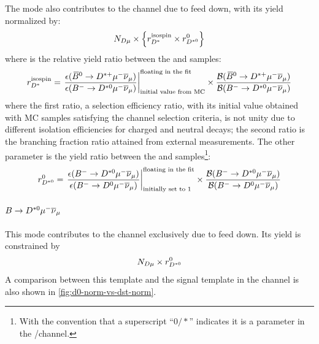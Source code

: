 The \Dstarp\muon mode also contributes to the \Dz channel due to feed down,
with its yield normalized by:
\begin{equation}
    N_{D\mu} \times \left\{
        r_{{{D}^*}}^\text{isospin} \times r_{{{D}^{*0}}}^{0}
    \right\}
\end{equation}
where \fitDstISO is the relative yield ratio between the \Dstarp\muon and
\Dstarz\muon samples:
\begin{equation}
    r_{{{D}^*}}^\text{isospin} =
    \left.\frac{
        \epsilon({{\kern 0.18em\overline{\kern -0.18em B}}{}^0} \rightarrow {\ensuremath{{D}^{*+}}}{\ensuremath{\mu^-}}{\ensuremath{{\overline{\nu}}_\mu}})
    }{
        \epsilon({{{B}^-}} \rightarrow {\ensuremath{{D}^{*0}}}{\ensuremath{\mu^-}}{\ensuremath{{\overline{\nu}}_\mu}})
    }\right|_\text{initial value from MC}^\text{floating in the fit}\times
    \frac{
        \mathcal{B}({{\kern 0.18em\overline{\kern -0.18em B}}{}^0} \rightarrow {\ensuremath{{D}^{*+}}}{\ensuremath{\mu^-}}{\ensuremath{{\overline{\nu}}_\mu}})
    }{
        \mathcal{B}({{{B}^-}} \rightarrow {\ensuremath{{D}^{*0}}}{\ensuremath{\mu^-}}{\ensuremath{{\overline{\nu}}_\mu}})
    }
\end{equation}
where the first ratio, a selection efficiency ratio,
with its initial value obtained with MC samples satisfying the \Dz channel
selection criteria,
is not unity due to different isolation efficiencies for charged
\Dstarp and neutral \Dstarz decays;
the second ratio is the branching fraction ratio attained from external
measurements.
The other parameter \fitnormfd is the yield ratio between the \Dstarz\muon and
\Dz\muon samples\footnote{
    With the convention that a superscript ``$0/*$'' indicates
    it is a parameter in the \Dz/\Dstar channel.
}:
\begin{equation}
    r_{{{D}^{*0}}}^{0} =
    \left.\frac{
        \epsilon({{{B}^-}} \rightarrow {\ensuremath{{D}^{*0}}}{\ensuremath{\mu^-}}{\ensuremath{{\overline{\nu}}_\mu}})
    }{
        \epsilon({{{B}^-}} \rightarrow {\ensuremath{{D}^0}}{\ensuremath{\mu^-}}{\ensuremath{{\overline{\nu}}_\mu}})
    }\right|_\text{initially set to 1}^\text{floating in the fit} \times
    \frac{
        \mathcal{B}({{{B}^-}} \rightarrow {\ensuremath{{D}^{*0}}}{\ensuremath{\mu^-}}{\ensuremath{{\overline{\nu}}_\mu}})
    }{
        \mathcal{B}({{{B}^-}} \rightarrow {\ensuremath{{D}^0}}{\ensuremath{\mu^-}}{\ensuremath{{\overline{\nu}}_\mu}})
    }
\end{equation}

\paragraph{$B \rightarrow D^{*0}{\mu^-}{{\overline{\nu}}_\mu}$}
This mode contributes to the \Dz channel exclusively due to feed down.
Its yield is constrained by
\begin{equation}
    N_{D\mu} \times r_{{{D}^{*0}}}^{0}
\end{equation}
A comparison between this template and the signal template in the \Dz
channel is also shown in \cref{fig:d0-norm-vs-dst-norm}.

